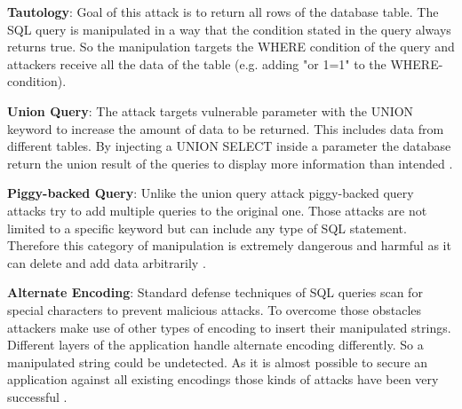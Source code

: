 \noindent \textbf{Tautology}: Goal of this attack is to return all rows of the database table. The SQL query is manipulated in a way that the condition stated in the query always returns true. So the manipulation targets the WHERE condition of the query and attackers receive all the data of the table (e.g. adding "or 1=1" to the WHERE-condition)\autocite[3]{Halfond2008}.\newline


\noindent\textbf{Union Query}: The attack targets vulnerable parameter with the UNION keyword to increase the amount of data to be returned. This includes data from different tables. By injecting a UNION SELECT inside a parameter the database return the union result of the queries to display more information than intended \autocite[4]{Halfond2008}.\newline


\noindent\textbf{Piggy-backed Query}: Unlike the union query attack piggy-backed query attacks try to add multiple queries to the original one. Those attacks are not limited to a specific keyword but can include any type of SQL statement. Therefore this category of manipulation is extremely dangerous and harmful as it can delete and add data arbitrarily \autocite[4]{Halfond2008}.\newline


\noindent\textbf{Alternate Encoding}: Standard defense techniques of SQL queries scan for special characters to prevent malicious attacks. To overcome those obstacles attackers make use of other types of encoding to insert their manipulated strings. Different layers of the application handle alternate encoding differently. So a manipulated string could be undetected. As it is almost possible to secure an application against all existing encodings those kinds of attacks have been very successful \autocite[5]{Halfond2008}.\newline

